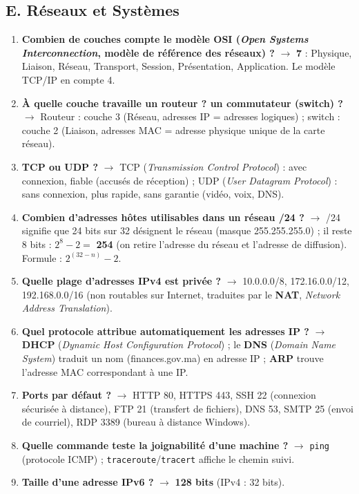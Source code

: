 \subsection*{E. Réseaux et Systèmes}
\begin{enumerate}[leftmargin=*]
    \item \textbf{Combien de couches compte le modèle OSI (\textit{Open Systems Interconnection}, modèle de référence des réseaux) ?} $\rightarrow$ \textbf{7} : Physique, Liaison, Réseau, Transport, Session, Présentation, Application. Le modèle TCP/IP en compte 4.
    \item \textbf{À quelle couche travaille un routeur ? un commutateur (switch) ?} $\rightarrow$ Routeur : couche 3 (Réseau, adresses IP = adresses logiques) ; switch : couche 2 (Liaison, adresses MAC = adresse physique unique de la carte réseau).
    \item \textbf{TCP ou UDP ?} $\rightarrow$ TCP (\textit{Transmission Control Protocol}) : avec connexion, fiable (accusés de réception) ; UDP (\textit{User Datagram Protocol}) : sans connexion, plus rapide, sans garantie (vidéo, voix, DNS).
    \item \textbf{Combien d'adresses hôtes utilisables dans un réseau /24 ?} $\rightarrow$ /24 signifie que 24 bits sur 32 désignent le réseau (masque 255.255.255.0) ; il reste 8 bits : $2^8 - 2 = $ \textbf{254} (on retire l'adresse du réseau et l'adresse de diffusion). Formule : $2^{(32 - n)} - 2$.
    \item \textbf{Quelle plage d'adresses IPv4 est privée ?} $\rightarrow$ 10.0.0.0/8, 172.16.0.0/12, 192.168.0.0/16 (non routables sur Internet, traduites par le \textbf{NAT}, \textit{Network Address Translation}).
    \item \textbf{Quel protocole attribue automatiquement les adresses IP ?} $\rightarrow$ \textbf{DHCP} (\textit{Dynamic Host Configuration Protocol}) ; le \textbf{DNS} (\textit{Domain Name System}) traduit un nom (finances.gov.ma) en adresse IP ; \textbf{ARP} trouve l'adresse MAC correspondant à une IP.
    \item \textbf{Ports par défaut ?} $\rightarrow$ HTTP 80, HTTPS 443, SSH 22 (connexion sécurisée à distance), FTP 21 (transfert de fichiers), DNS 53, SMTP 25 (envoi de courriel), RDP 3389 (bureau à distance Windows).
    \item \textbf{Quelle commande teste la joignabilité d'une machine ?} $\rightarrow$ \texttt{ping} (protocole ICMP) ; \texttt{traceroute}/\texttt{tracert} affiche le chemin suivi.
    \item \textbf{Taille d'une adresse IPv6 ?} $\rightarrow$ \textbf{128 bits} (IPv4 : 32 bits).

\end{enumerate}
